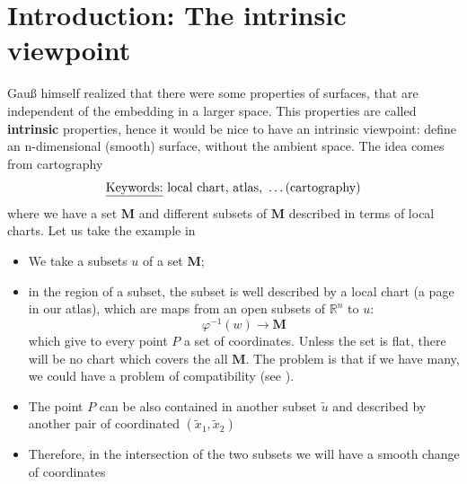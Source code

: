 \documentclass[../main.tex]{subfiles}
\begin{document}
\section[The intrinsic viewpoint]{Introduction: The intrinsic viewpoint}
Gauß himself realized that there were some properties of surfaces, that are independent of the embedding in a larger space. This properties are called \textbf{intrinsic} properties, hence it would be nice to have an intrinsic viewpoint: define an n-dimensional (smooth) surface, without the ambient space. The idea comes from cartography
\[
\textrm{\underline{Keywords:} local chart, atlas, } \dots \textrm{(cartography)}
\]
where we have a set $\mathbf{M}$ and different subsets of $\mathbf{M}$ described in terms of local charts. Let us take the example in 
\begin{itemize}
    \item We take a subsets $u$ of a set $\mathbf{M}$;
    \item in the region of a subset, the subset is well described by a local chart (a page in our atlas), which are maps from an open subsets of $\mathbb{R}^n$ to $u$:
    \[
    \varphi^{-1}(w)\to\mathbf{M}
    \]
    which give to every point $P$ a set of coordinates. Unless the set is flat, there will be no chart which covers the all $\mathbf{M}$. The problem is that if we have many, we could have a problem of compatibility (see ).
    \item The point $P$ can be also contained in another subset $\tilde{u}$ and described by another pair of coordinated $(\tilde{x}_1, \tilde{x}_2)$
    \item Therefore, in the intersection of the two subsets we will have a smooth change of coordinates 
\end{itemize} 
\end{document}
